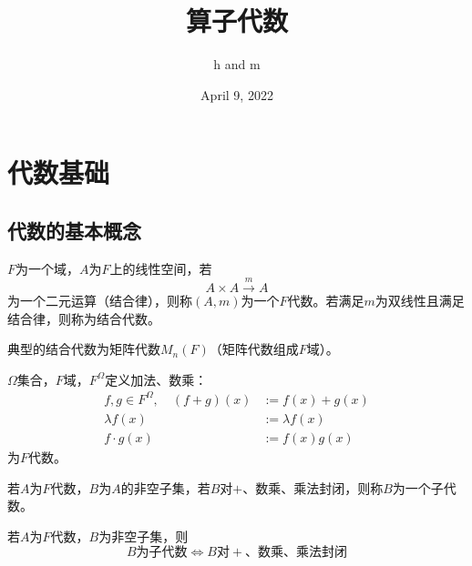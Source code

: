 \documentclass[lang=cn,a4paper,newtx,section]{elegantbook}
\title{算子代数}
\author{h and m}
\date{April 9, 2022}
\begin{document}
\maketitle
\frontmatter

\tableofcontents

\mainmatter

\chapter{代数基础}

\section{代数的基本概念}

\begin{definition}[F代数]
  $F$为一个域，$A$为$F$上的线性空间，若
  \begin{equation*}
    A \times A \xrightarrow{m} A
  \end{equation*}
  为一个二元运算（结合律），则称$(A,m)$为一个$F$代数。若满足$m$为双线性且满足结合律，则称为结合代数。
\end{definition}

\begin{example}[结合代数]
  典型的结合代数为矩阵代数$M_n(F)$（矩阵代数组成$F$域）。
\end{example}

\begin{example}[函数代数]
  $\Omega$集合，$F$域，$F^\Omega$定义加法、数乘：
  \begin{align*}
    f, g \in F^\Omega, \quad (f+g)(x) &:= f(x) + g(x) \\
    \lambda f(x) &:= \lambda f(x) \\
    f \cdot g(x) &:= f(x)g(x)
  \end{align*}
  为$F$代数。
\end{example}

\begin{definition}[子代数]
  若$A$为$F$代数，$B$为$A$的非空子集，若$B$对$+$、数乘、乘法封闭，则称$B$为一个子代数。
\end{definition}

\begin{proposition}
  若$A$为$F$代数，$B$为非空子集，则
  \begin{equation*}
    B\text{为子代数} \Longleftrightarrow B\text{对}+\text{、数乘、乘法封闭}
  \end{equation*}
\end{proposition}
\end{document}
